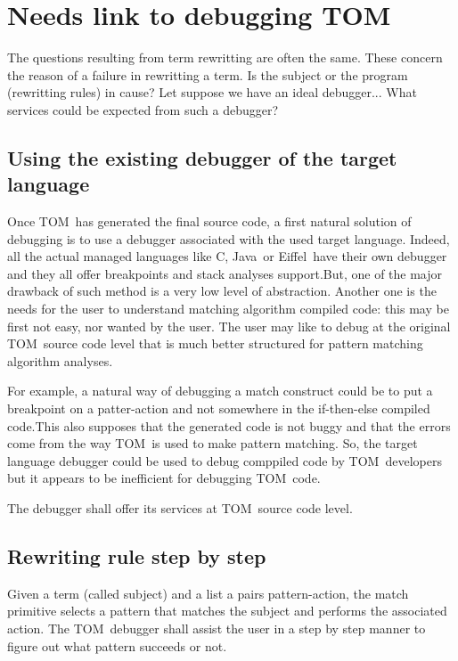\documentclass[a4paper]{article}
\newcommand{\TOM}{\textsf{TOM}}
\newcommand{\C}{\textsf{C}}
\newcommand{\Java}{\textsf{Java}}
\newcommand{\Eiffel}{\textsf{Eiffel}}
\begin{document}
\newpage

\section{Needs link to debugging \TOM}
The questions resulting from term rewritting are often the same. These
concern the reason of a failure in rewritting a term. Is the subject
or the program (rewritting rules) in cause? Let suppose we have an
ideal debugger... What services could be expected from such a debugger?

\subsection{Using the existing debugger of the target language}
Once \TOM\ has generated the final source code, a first natural
solution of debugging is to use a debugger associated with the
used target language. Indeed, all the actual managed languages like
\C, \Java\ or \Eiffel\ have their own debugger and they all
offer breakpoints and stack analyses support.But, one of the major drawback of such
method is a very low level of abstraction. Another one is the needs
for the user to understand matching algorithm compiled code:
this may be first not easy, nor wanted by the user. The user may like
to debug at the original \TOM\ source code level that is much better
structured for pattern matching algorithm analyses.

For example, a natural way of debugging a match construct could be to
put a breakpoint on a patter-action and not somewhere in the if-then-else
compiled code.This also supposes that the generated code is not buggy
and that the errors come from the way \TOM\ is used to make pattern matching.
So, the target language debugger could be used to debug comppiled code
by \TOM\ developers but it appears to be inefficient for debugging
\TOM\ code.

The debugger shall offer its services at \TOM\ source code level.


\subsection{Rewriting rule step by step}
Given a term (called subject) and a list a pairs pattern-action, the
match primitive selects a pattern that matches the subject and
performs the associated action.
The \TOM\ debugger shall assist the user in a step by step manner to
figure out what pattern succeeds or not.
\end{document}
